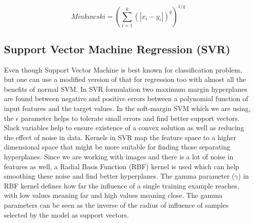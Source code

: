 \begin{equation}
\label{eq:minkowski_distance}
Minkowski = (\sum_{i=1}^{k} (|x_i - y_i|)^{q})^{1/q}
\end{equation}

\subsection{Support Vector Machine Regression (SVR)}
Even though Support Vector Machine\cite{svm_r} is best known for classification problem, but one can use a modified version of that for regression too with almost all the benefits of normal SVM. In SVR formulation two maximum margin hyperplanes are found between negative and positive errors between a polynomial function of input features and the target values. In the soft-margin SVM which we are using, the $\epsilon$ parameter helps to tolerate small errors and find better support vectors. Slack variables help to ensure existence of a convex solution as well as reducing the effect of noise in data. Kernels in SVR map the feature space to a higher dimensional space that might be more suitable for finding those separating hyperplanes. Since we are working with images and there is a lot of noise in features as well, a Radial Basis Function (RBF) kernel is used which can help smoothing these noise and find better hyperplanes. The gamma parameter ($\gamma$) in RBF kernel defines how far the influence of a single training example reaches, with low values meaning far and high values meaning close. The gamma parameters can be seen as the inverse of the radius of influence of samples selected by the model as support vectors.


